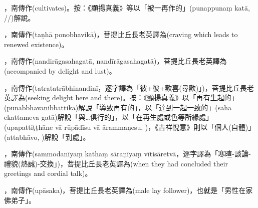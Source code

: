 \startitemgroup[noteitems]
\item{}，南傳作(cultivates)。按：《顯揚真義》等以「被一再作的」(punappunaṃ katā, //)解說。
\stopitemgroup

\startitemgroup[noteitems]
\item{}，南傳作(taṇhā ponobhavikā)，菩提比丘長老英譯為(craving which leads to renewed existence)。
\item{}，南傳作(nandirāgasahagatā, nandīrāgasahagatā)，菩提比丘長老英譯為(accompanied by delight and lust)。
\item{}，南傳作(tatratatrābhinandinī，逐字譯為「彼+彼+歡喜(尋歡)」)，菩提比丘長老英譯為(seeking delight here and there)。按：《顯揚真義》以「再有生起的」(punabbhavanibbattikā)解說「導致再有的」，以「達到一起一致的」(saha ekattameva gatā)解說「與…俱行的」，以「在再生處或色等所緣處」(upapattiṭṭhāne vā rūpādīsu vā ārammaṇesu, )，《吉祥悅意》則以「個人(自體)」(attabhāvo, )解說「到處」。
\stopitemgroup

\startitemgroup[noteitems]
\item{}，南傳作(sammodanīyaṃ kathaṃ sāraṇīyaṃ vītisāretvā，逐字譯為「寒暄-談論-禮貌(熱誠)-交換」)，菩提比丘長老英譯為(when they had concluded their greetings and cordial talk)。
\stopitemgroup

\startitemgroup[noteitems]
\item{}，南傳作(upāsaka)，菩提比丘長老英譯為(male lay follower)，也就是「男性在家佛弟子」。
\stopitemgroup

